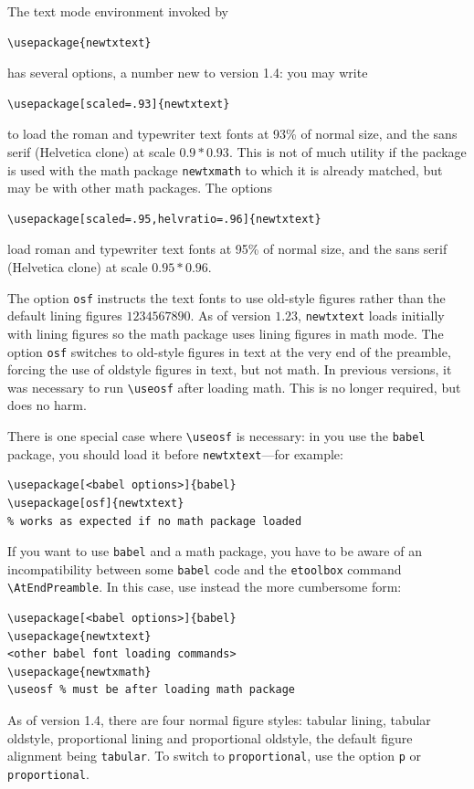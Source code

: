 \documentclass[11pt]{article}
\theoremstyle{oldplain}
\theoremstyle{plain}
\begin{document}
The text mode environment invoked by
\begin{verbatim}
\usepackage{newtxtext}
\end{verbatim}
has several options, a number new to version 1.4: you may write
\begin{verbatim}
\usepackage[scaled=.93]{newtxtext}
\end{verbatim}
to load the roman and typewriter text fonts at 93\% of normal size, and the sans serif (\textsf{Helvetica} clone) at scale $0.9*0.93$. This is not of much utility if the package is used with the math package {\tt newtxmath} to which it is already matched, but may be with other math packages. The options
\begin{verbatim}
\usepackage[scaled=.95,helvratio=.96]{newtxtext}
\end{verbatim}
load roman and typewriter text fonts at 95\% of normal size, and the sans serif (\textsf{Helvetica} clone) at scale $0.95*0.96$.

The option \texttt{osf} instructs the text fonts to use old-style figures  rather than the default lining figures $1234567890$. As of version $1.23$, {\tt newtxtext} loads initially with lining figures so the math package uses lining figures in math mode. The option {\tt osf} switches to old-style figures in text at the very end of the preamble, forcing the use of oldstyle figures in text, but not math. In previous versions, it was necessary to run 
\verb|\useosf| after loading math. This is no longer required, but does no harm. 

There is one special case where \verb|\useosf| is necessary: in you use the {\tt babel} package, you should load it before {\tt newtxtext}---for example:
\begin{verbatim}
\usepackage[<babel options>]{babel}
\usepackage[osf]{newtxtext}
% works as expected if no math package loaded
\end{verbatim}
If you want to use {\tt babel} and a math package, you have to be aware of an incompatibility between some {\tt babel} code and the {\tt etoolbox} command \verb|\AtEndPreamble|. In this case, use instead the more cumbersome form:
\begin{verbatim}
\usepackage[<babel options>]{babel}
\usepackage{newtxtext}
<other babel font loading commands>
\usepackage{newtxmath}
\useosf % must be after loading math package
\end{verbatim}
As of version 1.4, there are four normal figure styles: tabular lining, tabular oldstyle, proportional lining and proportional oldstyle, the default figure alignment being \texttt{tabular}. To switch to \texttt{proportional}, use the option \texttt{p} or \texttt{proportional}.
\end{document}
